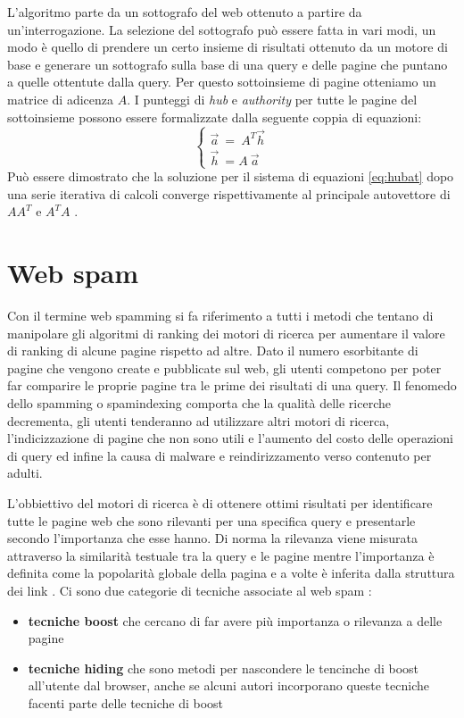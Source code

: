 L'algoritmo parte da un sottografo del web ottenuto a partire da un'interrogazione. La selezione del sottografo può essere fatta in vari modi, un modo è quello di prendere un certo insieme di risultati  ottenuto da un motore di base e generare un sottografo sulla base di una query e delle pagine che puntano a quelle ottentute dalla query. Per questo sottoinsieme di pagine otteniamo un matrice di adicenza \(A\). I punteggi di \textit{hub} e \textit{authority} per tutte le pagine del sottoinsieme possono essere formalizzate dalla seguente coppia di equazioni:
\begin{equation}
 \left\{
 \begin{array}{cc}
    \stackrel{\rightarrow}{a} \: = \: A^T \stackrel{\rightarrow}{h}\\
    \stackrel{\rightarrow}{h} \:= A \: \stackrel{\rightarrow}{a}
 \end{array}
 \right .
 \label{eq:hubat}
\end{equation}
Può essere dimostrato che la soluzione per il sistema di equazioni \ref{eq:hubat} dopo una serie iterativa di calcoli converge rispettivamente al principale autovettore di \(AA^T\) e \(A^TA\) \cite{Manning:2008:IIR:1394399p474}\cite{Spirin:2012:SWS:2207243.2207252}.

\section{Web spam}
Con il termine web spamming si fa riferimento a tutti i metodi che tentano di manipolare gli algoritmi di ranking dei motori di ricerca per aumentare il valore di ranking di alcune pagine rispetto ad altre\cite{ilprints646}.
Dato il numero esorbitante di pagine che vengono create e pubblicate sul web, gli utenti competono per poter far comparire le proprie pagine tra le prime dei risultati di una query.
Il fenomedo dello spamming o spamindexing comporta che la qualità delle ricerche decrementa, gli utenti tenderanno ad utilizzare altri motori di ricerca, l'indicizzazione di pagine che non sono utili e l'aumento del costo delle operazioni di query ed infine la causa di malware e reindirizzamento verso contenuto per adulti\cite{Spirin:2012:SWS:2207243.2207252}.

L'obbiettivo del motori di ricerca è di ottenere ottimi risultati per identificare tutte le pagine web che sono rilevanti per una specifica query e presentarle secondo l'importanza che esse hanno. Di norma la rilevanza viene misurata attraverso la similarità testuale tra la query e le pagine mentre l'importanza è definita come la popolarità globale della pagina e a volte è inferita dalla struttura dei link \cite{ilprints646}. Ci sono due categorie di tecniche associate al web spam \cite{ilprints646}:
\begin{itemize}
\item \textbf{tecniche boost} che cercano di far avere più importanza o rilevanza a delle pagine
\item \textbf{tecniche hiding} che sono metodi per nascondere le tencinche di boost all'utente dal browser, anche se alcuni autori incorporano queste tecniche facenti parte delle tecniche di boost
\end{itemize}

